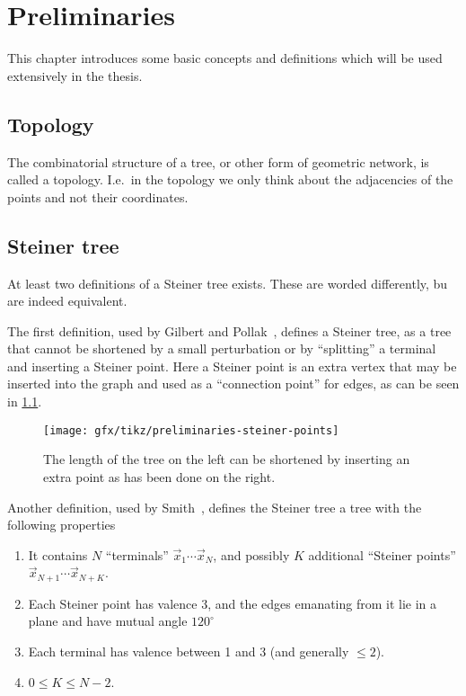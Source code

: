 {
\abnormalparskip{0pt}
\chapter{Preliminaries}
\label{cha:preliminaries}
}

This chapter introduces some basic concepts and definitions which will be used
extensively in the thesis.

\section{Topology}
\label{sec:topology}

The combinatorial structure of a tree, or other form of geometric network, is
called a topology.  I.e.\ in the topology we only think about the adjacencies of
the points and not their coordinates.

\section{Steiner tree}
\label{sec:steiner-tree}

At least two definitions of a Steiner tree exists.  These are worded
differently, bu are indeed equivalent.

The first definition, used by Gilbert and Pollak~\cite{Gilbert1968}, defines a
Steiner tree, as a tree that cannot be shortened by a small perturbation or by
``splitting'' a terminal and inserting a Steiner point.  Here a Steiner point is
an extra vertex that may be inserted into the graph and used as a ``connection
point'' for edges, as can be seen in \cref{fig:preliminaries-steiner-point}.

\begin{figure}[htbp]
\centering
\texttt{[image: gfx/tikz/preliminaries-steiner-points]}
\caption[Steiner point of isosceles triangle.]{The length of the tree on the left
  can be shortened by inserting an extra point as has been done on the
  right.\label{fig:preliminaries-steiner-point}}
\end{figure}

Another definition, used by Smith~\cite{Smith1992}, defines the Steiner tree a
tree with the following properties

\begin{enumerate}
\item It contains $N$ ``terminals'' $\vec{x}_1 \cdots \vec{x}_N$, and
  possibly $K$ additional ``Steiner points'' $\vec{x}_{N+1} \cdots
  \vec{x}_{N+K}$.
\item Each Steiner point has valence 3, and the edges emanating from it lie in a
  plane and have mutual angle $120^{\circ}$
\item Each terminal has valence between 1 and 3 (and generally $\le 2$).
\item $0 \le K \le N-2$.
\end{enumerate}

